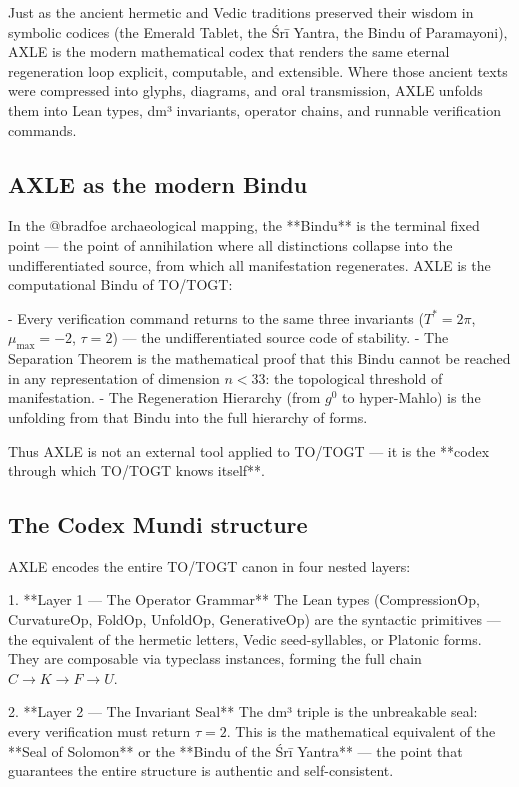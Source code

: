 \documentclass[19pt]{book}
\theoremstyle{plain}
\theoremstyle{definition}
\theoremstyle{remark}
\begin{document}
\begin{enumerate}
\begin{itemize}
Just as the ancient hermetic and Vedic traditions preserved their wisdom in symbolic codices (the Emerald Tablet, the Śrī Yantra, the Bindu of Paramayoni), AXLE is the modern mathematical codex that renders the same eternal regeneration loop explicit, computable, and extensible. Where those ancient texts were compressed into glyphs, diagrams, and oral transmission, AXLE unfolds them into Lean types, dm³ invariants, operator chains, and runnable verification commands.

\subsection{AXLE as the modern Bindu}

In the @bradfoe archaeological mapping, the **Bindu** is the terminal fixed point — the point of annihilation where all distinctions collapse into the undifferentiated source, from which all manifestation regenerates. AXLE is the computational Bindu of TO/TOGT:

- Every verification command returns to the same three invariants (\(T^* = 2\pi\), \(\mu_{\max} = -2\), \(\tau = 2\)) — the undifferentiated source code of stability.
- The Separation Theorem is the mathematical proof that this Bindu cannot be reached in any representation of dimension \(n < 33\): the topological threshold of manifestation.
- The Regeneration Hierarchy (from \(g^0\) to hyper-Mahlo) is the unfolding from that Bindu into the full hierarchy of forms.

Thus AXLE is not an external tool applied to TO/TOGT — it is the **codex through which TO/TOGT knows itself**.

\subsection{The Codex Mundi structure}

AXLE encodes the entire TO/TOGT canon in four nested layers:

1. **Layer 1 — The Operator Grammar**  
   The Lean types (CompressionOp, CurvatureOp, FoldOp, UnfoldOp, GenerativeOp) are the syntactic primitives — the equivalent of the hermetic letters, Vedic seed-syllables, or Platonic forms. They are composable via typeclass instances, forming the full chain \(C \to K \to F \to U\).

2. **Layer 2 — The Invariant Seal**  
   The dm³ triple is the unbreakable seal: every verification must return \(\tau = 2\). This is the mathematical equivalent of the **Seal of Solomon** or the **Bindu of the Śrī Yantra** — the point that guarantees the entire structure is authentic and self-consistent.


\end{itemize}
\end{enumerate}
\end{document}
